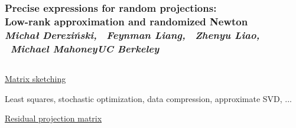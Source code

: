 \documentclass[8pt]{beamer}
\edef\polishl{\l}
\begin{document}
\begin{frame}
  \frametitle{
    \centering\textrm{Precise expressions for random projections:}\\
 \centering\textrm{Low-rank approximation and randomized Newton}\\[1mm]
\normalsize{\it Micha{\polishl } Derezi\'{n}ski, \ Feynman Liang,
 \ Zhenyu Liao, \ Michael Mahoney\qquad UC Berkeley}\\[-5mm]
}
\begin{columns}
  \begin{column}{0.53\textwidth}
    \begin{center}
      {\large\underline{Matrix sketching}}
      \vspace{3mm}
      
    \end{center}
    Least squares, stochastic optimization, data compression,
    approximate SVD, ...
    \vspace{5mm}
    
    \begin{center}
      {\large\underline{Residual projection matrix}}
      \vspace{3mm}
      

\end{center}
\end{column}
\end{columns}
\end{frame}
\end{document}
